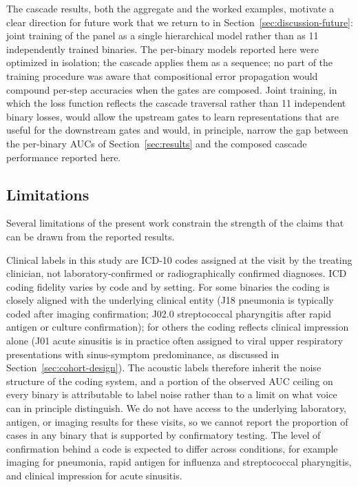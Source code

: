 \documentclass[utf8]{FrontiersinHarvard} %
\begin{document}
The cascade results, both the aggregate and the worked examples, motivate a clear direction for future work that we return to in Section~\ref{sec:discussion-future}: joint training of the panel as a single hierarchical model rather than as 11 independently trained binaries. The per-binary models reported here were optimized in isolation; the cascade applies them as a sequence; no part of the training procedure was aware that compositional error propagation would compound per-step accuracies when the gates are composed. Joint training, in which the loss function reflects the cascade traversal rather than 11 independent binary losses, would allow the upstream gates to learn representations that are useful for the downstream gates and would, in principle, narrow the gap between the per-binary AUCs of Section~\ref{sec:results} and the composed cascade performance reported here.

\subsection{Limitations}
\label{sec:discussion-limitations}

Several limitations of the present work constrain the strength of the claims that can be drawn from the reported results.

Clinical labels in this study are ICD-10 codes assigned at the visit by the treating clinician, not laboratory-confirmed or radiographically confirmed diagnoses. ICD coding fidelity varies by code and by setting. For some binaries the coding is closely aligned with the underlying clinical entity (J18 pneumonia is typically coded after imaging confirmation; J02.0 streptococcal pharyngitis after rapid antigen or culture confirmation); for others the coding reflects clinical impression alone (J01 acute sinusitis is in practice often assigned to viral upper respiratory presentations with sinus-symptom predominance, as discussed in Section~\ref{sec:cohort-design}). The acoustic labels therefore inherit the noise structure of the coding system, and a portion of the observed AUC ceiling on every binary is attributable to label noise rather than to a limit on what voice can in principle distinguish. We do not have access to the underlying laboratory, antigen, or imaging results for these visits, so we cannot report the proportion of cases in any binary that is supported by confirmatory testing. The level of confirmation behind a code is expected to differ across conditions, for example imaging for pneumonia, rapid antigen for influenza and streptococcal pharyngitis, and clinical impression for acute sinusitis.
\end{document}
